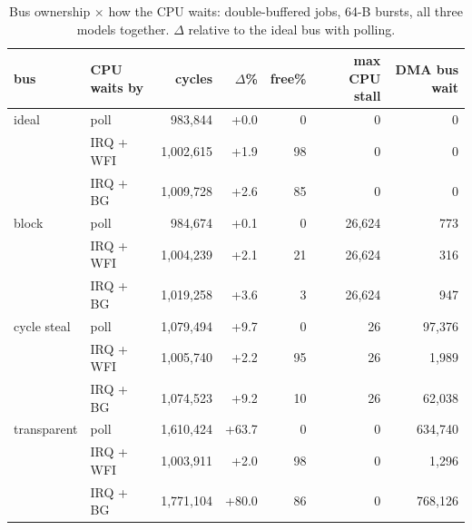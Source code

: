 \begin{table}[t]\centering\footnotesize\setlength{\tabcolsep}{3pt}
\caption{Bus ownership $\times$ how the CPU waits: double-buffered jobs, 64-B bursts, all three models together. $\Delta$ relative to the ideal bus with polling.}\label{tab:bus}
\begin{tabular}{@{}llrrrrr@{}}\toprule
bus & CPU waits by & cycles & $\Delta$\% & free\% & max CPU stall & DMA bus wait\\\midrule
ideal & poll & 983{,}844 & +0.0 & 0 & 0 & 0 \\
 & IRQ + WFI & 1{,}002{,}615 & +1.9 & 98 & 0 & 0 \\
 & IRQ + BG & 1{,}009{,}728 & +2.6 & 85 & 0 & 0 \\
\midrule
block & poll & 984{,}674 & +0.1 & 0 & 26{,}624 & 773 \\
 & IRQ + WFI & 1{,}004{,}239 & +2.1 & 21 & 26{,}624 & 316 \\
 & IRQ + BG & 1{,}019{,}258 & +3.6 & 3 & 26{,}624 & 947 \\
\midrule
cycle steal & poll & 1{,}079{,}494 & +9.7 & 0 & 26 & 97{,}376 \\
 & IRQ + WFI & 1{,}005{,}740 & +2.2 & 95 & 26 & 1{,}989 \\
 & IRQ + BG & 1{,}074{,}523 & +9.2 & 10 & 26 & 62{,}038 \\
\midrule
transparent & poll & 1{,}610{,}424 & +63.7 & 0 & 0 & 634{,}740 \\
 & IRQ + WFI & 1{,}003{,}911 & +2.0 & 98 & 0 & 1{,}296 \\
 & IRQ + BG & 1{,}771{,}104 & +80.0 & 86 & 0 & 768{,}126 \\
\bottomrule\end{tabular}\end{table}
